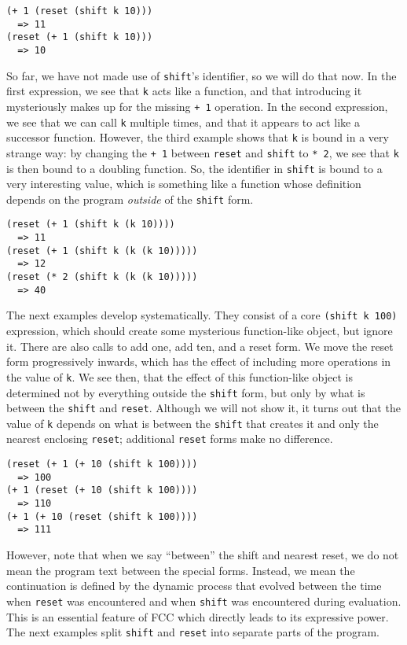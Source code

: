 \documentclass[11pt]{article}
\begin{document}
\begin{verbatim}
(+ 1 (reset (shift k 10)))
  => 11
(reset (+ 1 (shift k 10)))
  => 10
\end{verbatim}

So far, we have not made use of \texttt{shift}'s identifier, so we will do that now.
In the first expression, we see that \texttt{k} acts like a function, and that introducing it mysteriously makes up for the missing \texttt{+ 1} operation.
In the second expression, we see that we can call \texttt{k} multiple times, and that it appears to act like a successor function.
However, the third example shows that \texttt{k} is bound in a very strange way:
by changing the \texttt{+ 1} between \texttt{reset} and \texttt{shift} to \texttt{* 2}, we see that \texttt{k} is then bound to a doubling function.
So, the identifier in \texttt{shift} is bound to a very interesting value, which is something like a function whose definition depends on the program \emph{outside} of the \texttt{shift} form.

\begin{verbatim}
(reset (+ 1 (shift k (k 10))))
  => 11
(reset (+ 1 (shift k (k (k 10)))))
  => 12
(reset (* 2 (shift k (k (k 10)))))
  => 40
\end{verbatim}

The next examples develop systematically.
They consist of a core \texttt{(shift k 100)} expression, which should create some mysterious function-like object, but ignore it.
There are also calls to add one, add ten, and a reset form.
We move the reset form progressively inwards, which has the effect of including more operations in the value of \texttt{k}.
We see then, that the effect of this function-like object is determined not by everything outside the \texttt{shift} form, but only by what is between the \texttt{shift} and \texttt{reset}.
Although we will not show it, it turns out that the value of \texttt{k} depends on what is between the \texttt{shift} that creates it and only the nearest enclosing \texttt{reset}; additional \texttt{reset} forms make no difference.

\begin{verbatim}
(reset (+ 1 (+ 10 (shift k 100))))
  => 100
(+ 1 (reset (+ 10 (shift k 100))))
  => 110
(+ 1 (+ 10 (reset (shift k 100))))
  => 111
\end{verbatim}

However, note that when we say ``between'' the shift and nearest reset, we do not mean the program text between the special forms.
Instead, we mean the continuation is defined by the dynamic process that evolved between the time when \texttt{reset} was encountered and when \texttt{shift} was encountered during evaluation.
This is an essential feature of FCC which directly leads to its expressive power.
The next examples split \texttt{shift} and \texttt{reset} into separate parts of the program.
\end{document}

